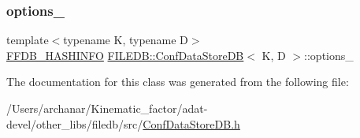 \subsubsection{\texorpdfstring{options\_}{options\_}}
{\footnotesize\ttfamily template$<$typename K, typename D$>$ \\
\mbox{\hyperlink{structFFDB__HASHINFO}{F\+F\+D\+B\+\_\+\+H\+A\+S\+H\+I\+N\+FO}} \mbox{\hyperlink{classFILEDB_1_1ConfDataStoreDB}{F\+I\+L\+E\+D\+B\+::\+Conf\+Data\+Store\+DB}}$<$ K, D $>$\+::options\+\_\+\hspace{0.3cm}{\ttfamily [protected]}}



The documentation for this class was generated from the following file\+:\begin{DoxyCompactItemize}
\item 
/\+Users/archanar/\+Kinematic\+\_\+factor/adat-\/devel/other\+\_\+libs/filedb/src/\mbox{\hyperlink{adat-devel_2other__libs_2filedb_2src_2ConfDataStoreDB_8h}{Conf\+Data\+Store\+D\+B.\+h}}\end{DoxyCompactItemize}
